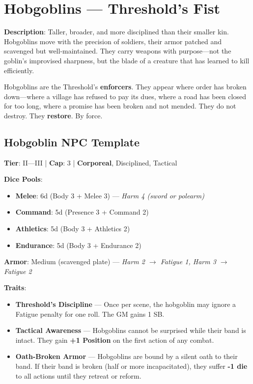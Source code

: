 \section{Hobgoblins --- Threshold's Fist}

\textbf{Description}: Taller, broader, and more disciplined than their smaller kin. Hobgoblins move with the precision of soldiers, their armor patched and scavenged but well-maintained. They carry weapons with purpose---not the goblin's improvised sharpness, but the blade of a creature that has learned to kill efficiently.

Hobgoblins are the Threshold's \textbf{enforcers}. They appear where order has broken down---where a village has refused to pay its dues, where a road has been closed for too long, where a promise has been broken and not mended. They do not destroy. They \textbf{restore}. By force.

\subsection{Hobgoblin NPC Template}

\textbf{Tier}: II---III | \textbf{Cap}: 3 | \textbf{Corporeal}, Disciplined, Tactical

\textbf{Dice Pools}:
\begin{itemize}
    \item \textbf{Melee}: 6d (Body 3 + Melee 3) --- \textit{Harm 4 (sword or polearm)}
    \item \textbf{Command}: 5d (Presence 3 + Command 2)
    \item \textbf{Athletics}: 5d (Body 3 + Athletics 2)
    \item \textbf{Endurance}: 5d (Body 3 + Endurance 2)
\end{itemize}

\textbf{Armor}: Medium (scavenged plate) --- \textit{Harm 2 $\rightarrow$ Fatigue 1, Harm 3 $\rightarrow$ Fatigue 2}

\textbf{Traits}:
\begin{itemize}
    \item \textbf{Threshold's Discipline} --- Once per scene, the hobgoblin may ignore a Fatigue penalty for one roll. The GM gains 1 SB.
    \item \textbf{Tactical Awareness} --- Hobgoblins cannot be surprised while their band is intact. They gain \textbf{+1 Position} on the first action of any combat.
    \item \textbf{Oath-Broken Armor} --- Hobgoblins are bound by a silent oath to their band. If their band is broken (half or more incapacitated), they suffer \textbf{-1 die} to all actions until they retreat or reform.
\end{itemize}

